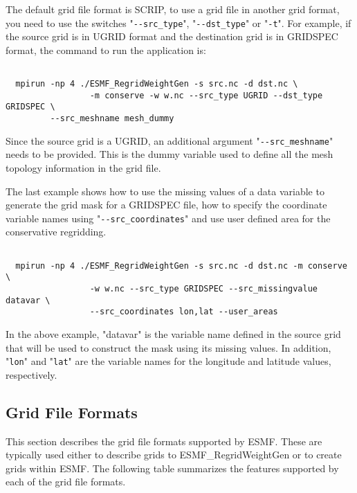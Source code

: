 The default grid file format is SCRIP, to use a grid file in another grid format, you
need to use the switches "{\tt \verb+--+src\_type}", "{\tt \verb+--+dst\_type}" or "{\tt -t}".  For example, if the
source grid is in UGRID format and the destination grid is in GRIDSPEC format, the command
to run the application is:

\begin{verbatim}

  mpirun -np 4 ./ESMF_RegridWeightGen -s src.nc -d dst.nc \
                 -m conserve -w w.nc --src_type UGRID --dst_type GRIDSPEC \
		 --src_meshname mesh_dummy

\end{verbatim}
 
Since the source grid is a UGRID, an additional argument "{\tt \verb+--+src\_meshname}" needs to be provided.  This is the dummy variable used to define all the mesh topology information in the
grid file.

The last example shows how to use the missing values of a data variable to generate the
grid mask for a GRIDSPEC file, how to specify the coordinate variable names
using "{\tt \verb+--+src\_coordinates}"
 and use user defined area for the conservative regridding.

\begin{verbatim}

  mpirun -np 4 ./ESMF_RegridWeightGen -s src.nc -d dst.nc -m conserve \
                 -w w.nc --src_type GRIDSPEC --src_missingvalue datavar \
                 --src_coordinates lon,lat --user_areas

\end{verbatim}

In the above example, "datavar" is the variable name defined in the source grid that will
 be used to construct the mask using its missing values.  In addition, "{\tt lon}" and "{\tt lat}" are the
variable names for the longitude and latitude values, respectively.


\subsection{Grid File Formats}

  This section describes the grid file formats supported by ESMF. These are typically used either to describe grids to ESMF\_RegridWeightGen or to create grids within ESMF. The following table summarizes the 
features supported by each of the grid file formats.

